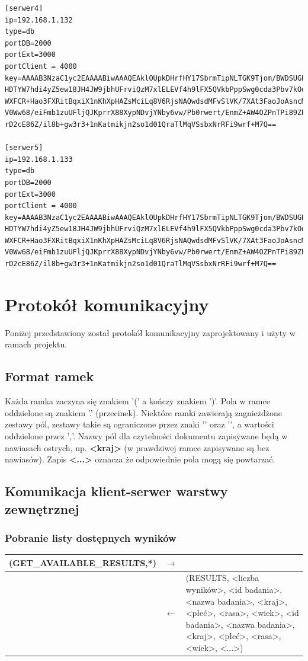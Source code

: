 \begin{lstlisting}[style=incode, caption=Plik konfiguracyjny serwera]
[serwer4]
ip=192.168.1.132
type=db
portDB=2000
portExt=3000
portClient = 4000
key=AAAAB3NzaC1yc2EAAAABiwAAAQEAklOUpkDHrfHY17SbrmTipNLTGK9Tjom/BWDSUGPl+nafzl
HDTYW7hdi4yZ5ew18JH4JW9jbhUFrviQzM7xlELEVf4h9lFX5QVkbPppSwg0cda3Pbv7kOdJ/MtyBl
WXFCR+Hao3FXRitBqxiX1nKhXpHAZsMciLq8V6RjsNAQwdsdMFvSlVK/7XAt3FaoJoAsncM1Q9x5+3
V0Ww68/eiFmb1zuUFljQJKprrX88XypNDvjYNby6vw/Pb0rwert/EnmZ+AW4OZPnTPi89ZPmVMLuay
rD2cE86Z/il8b+gw3r3+1nKatmikjn2so1d01QraTlMqVSsbxNrRFi9wrf+M7Q==

[serwer5]
ip=192.168.1.133
type=db
portDB=2000
portExt=3000
portClient = 4000
key=AAAAB3NzaC1yc2EAAAABiwAAAQEAklOUpkDHrfHY17SbrmTipNLTGK9Tjom/BWDSUGPl+nafzl
HDTYW7hdi4yZ5ew18JH4JW9jbhUFrviQzM7xlELEVf4h9lFX5QVkbPppSwg0cda3Pbv7kOdJ/MtyBl
WXFCR+Hao3FXRitBqxiX1nKhXpHAZsMciLq8V6RjsNAQwdsdMFvSlVK/7XAt3FaoJoAsncM1Q9x5+3
V0Ww68/eiFmb1zuUFljQJKprrX88XypNDvjYNby6vw/Pb0rwert/EnmZ+AW4OZPnTPi89ZPmVMLuay
rD2cE86Z/il8b+gw3r3+1nKatmikjn2so1d01QraTlMqVSsbxNrRFi9wrf+M7Q==
\end{lstlisting}

\section{Protokół komunikacyjny}
Poniżej przedstawiony został protokół komunikacyjny zaprojektowany i użyty w ramach projektu.

\subsection{Format ramek}
Każda ramka zaczyna się znakiem '(' a kończy znakiem ')'. Pola w ramce oddzielone są znakiem '.' (przecinek). Niektóre ramki zawierają zagnieżdżone zestawy pól, zestawy takie są ograniczone przez znaki '{' oraz '}', a wartości oddzielone przez ','. Nazwy pól dla czytelności dokumentu zapisywane będą w nawiasach ostrych, np. \textbf{<kraj>} (w prawdziwej ramce zapisywane są bez nawiasów). Zapis \textbf{<...>} oznacza że odpowiednie pola mogą się powtarzać.

\subsection{Komunikacja klient-serwer warstwy zewnętrznej}

\subsubsection{Pobranie listy dostępnych wyników}

\begin{longtable}{| p{} | p{}| p{} |} 
\hline
(GET\_AVAILABLE\_RESULTS,*) & $\rightarrow$ &  \\ \hline
 & $\leftarrow$ & (RESULTS, <liczba wyników>, <id badania>, <nazwa badania>, <kraj>, <płeć>, <rasa>, <wiek>, <id badania>, <nazwa badania>, <kraj>, <płeć>, <rasa>, <wiek>, <...>) \\ \hline
\end{longtable}

